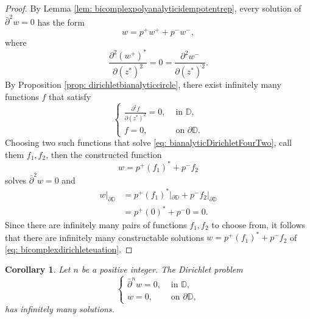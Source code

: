 \documentclass[12pt,reqno]{amsart}
\newtheorem{corr}[theorem]{Corollary}
\theoremstyle{definition}
\theoremstyle{remark}
\newcommand{\p}{\partial}
\newcommand{\dbar}{\bar\partial}
\newcommand{\disk}{\mathbb{D}}
\begin{document}
            \begin{proof}

            

                By Lemma \ref{lem: bicomplexpolyanalyticidempotentrep}, every solution of $\dbar^2 w = 0$ has the form 
                \[
                    w = p^+ w^+ + p^- w^-,
                \]
                where
                \[
                    \frac{\p^2 (w^+)^*}{\p (z^*)^2} = 0 = \frac{\p^2 w^-}{\p (z^*)^2}.
                \]
                By Proposition \ref{prop: dirichletbianalyticcircle}, there exist infinitely many functions $f$ that satisfy 
                \begin{equation}\label{eq: bianalyticDirichletFourTwo}
                    \begin{cases}
                        \frac{\p^2 f}{\p(z^*)^2} = 0, & \text{ in } \disk,\\
                        f = 0, & \text{ on } \p\disk.
                    \end{cases}
                \end{equation}
                Choosing two such functions that solve \eqref{eq: bianalyticDirichletFourTwo}, call them $f_1, f_2$, then the constructed function 
                \[
                    w = p^+ (f_1)^* + p^- f_2
                \]
                solves $\dbar^2 w = 0$ and 
                \begin{align*}
                    w|_{\p\disk} &= p^+ (f_1)^*|_{\p\disk} + p^- f_2|_{\p\disk} \\
                    &= p^+ (0)^* + p^- 0 = 0.
                \end{align*}
                Since there are infinitely many pairs of functions $f_1, f_2$ to choose from, it follows that there are infinitely many constructable solutions $w = p^+ (f_1)^* + p^- f_2$ of \eqref{eq: bicomplexdirichleteuation}.

                
            \end{proof}

           

            \begin{corr}\label{cor: bicomplexPolyDirichletNotWellPosed}
                Let $n$ be a positive integer. The Dirichlet problem 
                \[
                    \begin{cases}
                    \dbar^n w = 0, & \text{ in } \disk,\\
                    w = 0, & \text{ on } \p\disk,
                    \end{cases}
                \]
                has infinitely many solutions. 
            \end{corr}
\end{document}
